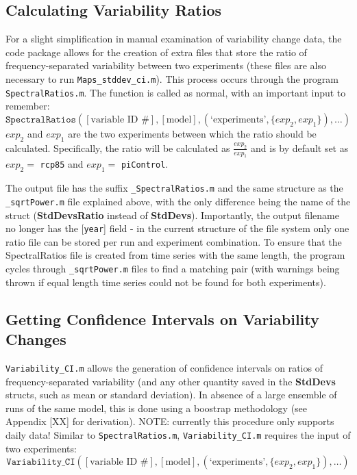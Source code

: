 \documentclass{article}
\begin{document}
\subsection{Calculating Variability Ratios}
For a slight simplification in manual examination of variability change data, the code package allows for the creation of extra files that store the ratio of frequency-separated variability between two experiments (these files are also necessary to run \texttt{Maps\_stddev\_ci.m}). This process occurs through the program \texttt{SpectralRatios.m}. The function is called as normal, with an important input to remember:
\begin{equation}
\texttt{SpectralRatios}([\text{variable ID \#}],[\text{model}],(\text{`experiments'},\{exp_2,exp_1\}),\dots)
\end{equation}
$exp_2$ and $exp_1$ are the two experiments between which the ratio should be calculated. Specifically, the ratio will be calculated as $\frac{exp_2}{exp_1}$ and is by default set as $exp_2=$ \texttt{rcp85} and $exp_1=$ \texttt{piControl}.

The output file has the suffix \texttt{\_SpectralRatios.m} and the same structure as the \texttt{\_sqrtPower.m} file explained above, with the only difference being the name of the struct (\textbf{StdDevsRatio} instead of \textbf{StdDevs}). Importantly, the output filename no longer has the [\texttt{year}] field - in the current structure of the file system only one ratio file can be stored per run and experiment combination. To ensure that the SpectralRatios file is created from time series with the same length, the program cycles through \texttt{\_sqrtPower.m} files to find a matching pair (with warnings being thrown if equal length time series could not be found for both experiments). 

\subsection{Getting Confidence Intervals on Variability Changes}
\label{sec:var_ci}
\texttt{Variability\_CI.m} allows the generation of confidence intervals on ratios of frequency-separated variability (and any other quantity saved in the \textbf{StdDevs} structs, such as mean or standard deviation). In absence of a large ensemble of runs of the same model, this is done using a boostrap methodology (see Appendix [XX] for derivation). NOTE: currently this procedure only supports daily data! Similar to \texttt{SpectralRatios.m}, \texttt{Variability\_CI.m} requires the input of two experiments: 
\begin{equation}
\texttt{Variability\_CI}([\text{variable ID \#}],[\text{model}],(\text{`experiments'},\{exp_2,exp_1\}),\dots)
\end{equation}
\end{document}

